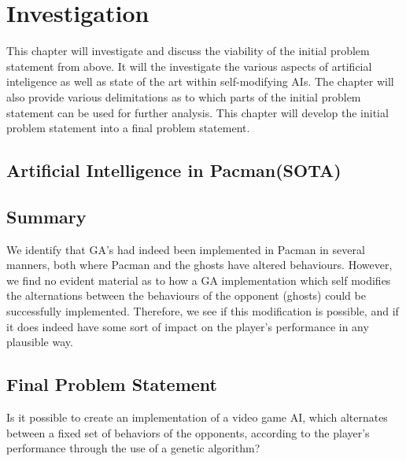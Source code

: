 
\section{Investigation} \label{sec:preanalysus}
This chapter will investigate and discuss the viability of the initial problem statement from above. It will the investigate the various aspects of artificial inteligence as well as state of the art within self-modifying AIs. The chapter will also provide various delimitations as to which parts of the initial problem statement can be used for further analysis. This chapter will develop the initial problem statement into a final problem statement.





\subsection{Artificial Intelligence in Pacman(SOTA)}



\subsection{Summary}
We identify that GA’s had indeed been implemented in Pacman in several manners, both where Pacman and the ghosts have altered behaviours. However, we find no evident material as to how a GA implementation which self modifies the alternations between the behaviours of the opponent (ghosts) could be successfully implemented. Therefore, we see if this modification is possible, and if it does indeed have some sort of impact on the player’s performance in any plausible way.


\subsection{Final Problem Statement} \label{sec:finalproblemstatement}
Is it possible to create an implementation of a video game AI, which alternates between a fixed set of behaviors of the opponents, according to the player's performance through the use of a genetic algorithm?